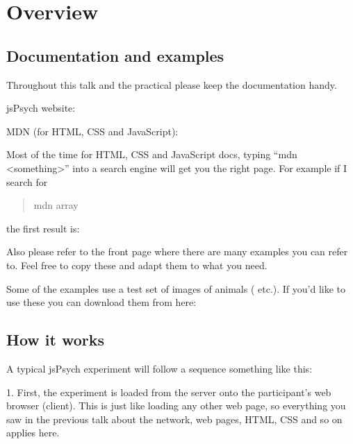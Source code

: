 \documentclass[letterpaper,10pt,english]{sphinxmanual}
\begin{document}
\section{Overview}
\label{\detokenize{jspsych_au:overview}}

\subsection{Documentation and examples}
\label{\detokenize{jspsych_au:documentation-and-examples}}
Throughout this talk and the practical please keep the documentation handy.

jsPsych website: 

MDN (for HTML, CSS and JavaScript): 

Most of the time for HTML, CSS and JavaScript docs, typing “mdn \textless{}something\textgreater{}”
into a search engine will get you the right page. For example if I search for
\begin{quote}

mdn array
\end{quote}

the first result is:


Also please refer to the front page where there are many examples you can
refer to. Feel free to copy these and adapt them to what you need.

Some of the examples use a test set of images of animals ( etc.).
If you’d like to use these you can download them from here:



\subsection{How it works}
\label{\detokenize{jspsych_au:how-it-works}}
A typical jsPsych experiment will follow a sequence something like this:

1. First, the experiment is loaded from the server onto the participant’s
web browser (client). This is just like loading any other web page, so everything
you saw in the previous talk about the network, web pages, HTML, CSS and so on
applies here.

\begin{DUlineblock}{0em}
\item[] 
\end{DUlineblock}
\end{document}
